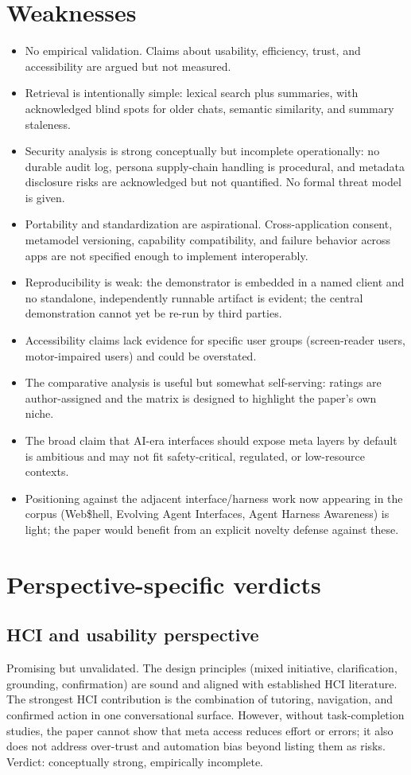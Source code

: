 \documentclass[11pt,a4paper]{article}
\begin{document}
\section{Weaknesses}
\begin{itemize}[leftmargin=*]
\item No empirical validation. Claims about usability, efficiency, trust, and accessibility are argued but not measured.
\item Retrieval is intentionally simple: lexical search plus summaries, with acknowledged blind spots for older chats, semantic similarity, and summary staleness.
\item Security analysis is strong conceptually but incomplete operationally: no durable audit log, persona supply-chain handling is procedural, and metadata disclosure risks are acknowledged but not quantified. No formal threat model is given.
\item Portability and standardization are aspirational. Cross-application consent, metamodel versioning, capability compatibility, and failure behavior across apps are not specified enough to implement interoperably.
\item Reproducibility is weak: the demonstrator is embedded in a named client and no standalone, independently runnable artifact is evident; the central demonstration cannot yet be re-run by third parties.
\item Accessibility claims lack evidence for specific user groups (screen-reader users, motor-impaired users) and could be overstated.
\item The comparative analysis is useful but somewhat self-serving: ratings are author-assigned and the matrix is designed to highlight the paper's own niche.
\item The broad claim that AI-era interfaces should expose meta layers by default is ambitious and may not fit safety-critical, regulated, or low-resource contexts.
\item Positioning against the adjacent interface/harness work now appearing in the corpus (Web\$hell, Evolving Agent Interfaces, Agent Harness Awareness) is light; the paper would benefit from an explicit novelty defense against these.
\end{itemize}

\section{Perspective-specific verdicts}

\subsection{HCI and usability perspective}
Promising but unvalidated. The design principles (mixed initiative, clarification, grounding, confirmation) are sound and aligned with established HCI literature. The strongest HCI contribution is the combination of tutoring, navigation, and confirmed action in one conversational surface. However, without task-completion studies, the paper cannot show that meta access reduces effort or errors; it also does not address over-trust and automation bias beyond listing them as risks. Verdict: conceptually strong, empirically incomplete.
\end{document}
